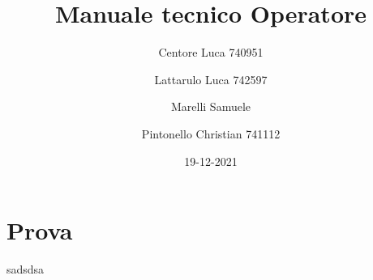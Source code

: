 \documentclass{article}
\title{Manuale tecnico Operatore}
\author{Centore Luca 740951 \and Lattarulo Luca 742597 \and Marelli Samuele \and Pintonello Christian 741112}
\date{19-12-2021}
\begin{document}
    \maketitle
    \section{Prova}\label{sec:prova}
    sadsdsa
\end{document}
